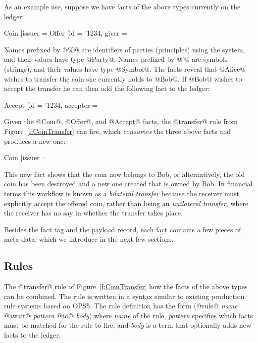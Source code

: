 As an example use, suppose we have facts of the above types currently on the ledger:
\begin{small}
\begin{code}
 Coin   [issuer = %
 Offer  [id = '1234, giver = %
\end{code}
\end{small}

Names prefixed by @\%@ are identifiers of parties (principles) using the system, and their values have type @Party@. Names prefixed by @'@ are symbols (strings), and their values have type @Symbol@. The facts reveal that @Alice@ wishes to transfer the coin she currently holds to @Bob@. If @Bob@ wishes to accept the transfer he can then add the following fact to the ledger:
\begin{small}
\begin{code}
 Accept [id = '1234, accepter = %
\end{code}
\end{small}

Given the @Coin@, @Offer@, and @Accept@ facts, the @transfer@ rule from Figure~\ref{f:CoinTransfer} can fire, which \emph{consumes} the three above facts and produces a new one:
\begin{small}
\begin{code}
 Coin [issuer = %
\end{code}
\end{small}

This new fact shows that the coin now belongs to Bob, or alternatively, the old coin has been destroyed and a new one created that is owned by Bob. In financial terms this workflow is known as a \emph{bilateral transfer} because the receiver must explicitly accept the offered coin, rather than being an \emph{unilateral transfer}, where the receiver has no say in whether the transfer takes place.

Besides the fact tag and the payload record, each fact contains a few pieces of meta-data, which we introduce in the next few sections.


\subsection{Rules}
The @transfer@ rule of Figure~\ref{f:CoinTransfer} how the facts of the above types can be combined. The rule is written in a syntax similar to existing production rule systems based on OPS5. The rule definition has the form (@rule@ \emph{name} @await@ \emph{pattern} @to@ \emph{body}) where \emph{name} of the rule, \emph{pattern} specifies which facts must be matched for the rule to fire, and \emph{body} is a term that optionally adds new facts to the ledger.


